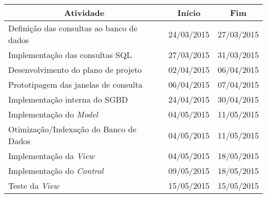 \documentclass[a4paper,12pt]{article}
\begin{document}
{\normalsize %

\begin{longtable}{|l|c|c|}
\hline
\multicolumn{1}{|c|}{\textbf{Atividade}}  & \multicolumn{1}{c|}{\textbf{Início}} & \multicolumn{1}{c|}{\textbf{Fim}} \\ \hline

\hline
\rowcolor{electricgreen}
Definição das consultas ao banco de dados & 24/03/2015                           & 27/03/2015                        \\ \hline

\hline
\rowcolor{electricgreen}
Implementação das consultas SQL           & 27/03/2015                           & 31/03/2015                        \\ \hline

\hline
\rowcolor{electricgreen}
Desenvolvimento do plano de projeto       & 02/04/2015                           & 06/04/2015                        \\ 

\hline
\rowcolor{electricgreen}
Prototipagem das janelas de consulta      & 06/04/2015                           & 07/04/2015                        \\ \hline

\hline
\rowcolor{electricgreen}
Implementação interna do SGBD             & 24/04/2015                           & 30/04/2015                        \\ \hline

\hline
\rowcolor{electricgreen}
Implementação do \textit{Model}           & 04/05/2015                           & 11/05/2015                        \\ \hline

\hline
\rowcolor{electricgreen}
Otimização/Indexação do Banco de Dados    & 04/05/2015                           & 11/05/2015                        \\ \hline

\hline
\rowcolor{electricgreen}
Implementação da \textit{View}            & 04/05/2015                           & 18/05/2015                        \\ \hline

\hline
\rowcolor{electricgreen}
Implementação do \textit{Control}         & 09/05/2015                           & 18/05/2015                        \\ \hline

\hline
\rowcolor{electricgreen}
Teste da \textit{View}                    & 15/05/2015                           & 15/05/2015                        \\ \hline


\end{longtable}}
\end{document}
